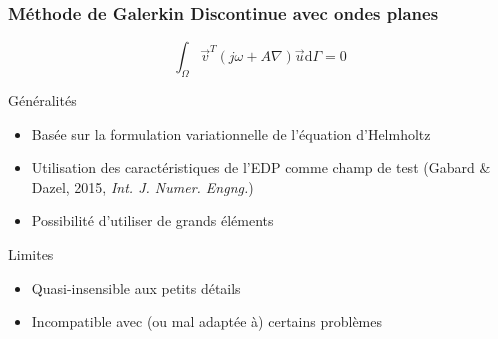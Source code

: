 \documentclass[10pt, compress]{beamer}
\begin{document}
\begin{frame}
	\frametitle{Méthode de Galerkin Discontinue avec ondes planes}

	$$\int_\Omega \vec{v}^T\left(j\omega + A\nabla\right)\vec{u}\mathrm{d}\Gamma = 0$$

	\begin{block}{Généralités}
		\begin{itemize}
			\item Basée sur la formulation variationnelle de l'équation d'Helmholtz
            \item Utilisation des caractéristiques de l'EDP comme champ de test (Gabard \& Dazel, 2015, \textit{Int. J.
                Numer. Engng.})
			\item Possibilité d'utiliser de grands éléments
		\end{itemize}
	\end{block}

	\pause

	\begin{block}{Limites}
		\begin{itemize}
			\item Quasi-insensible aux petits détails
			\item Incompatible avec (ou mal adaptée à) certains problèmes
		\end{itemize}
	\end{block}
\end{frame}
\end{document}

